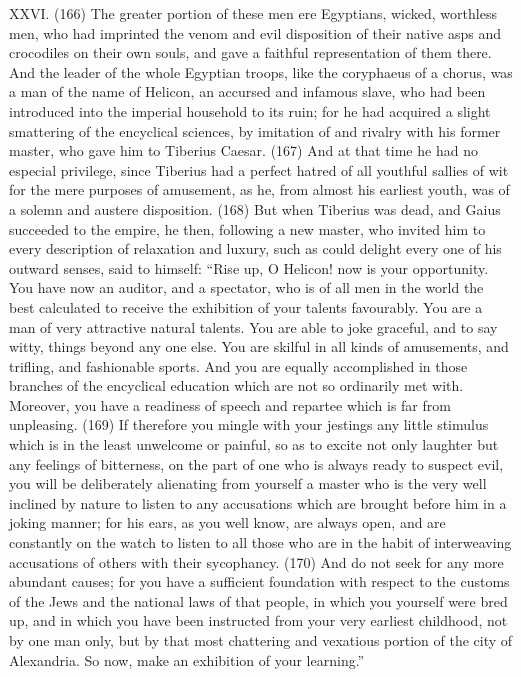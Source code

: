 XXVI. (166) The greater portion of these men ere Egyptians, wicked, worthless men, who had
imprinted the venom and evil disposition of their native asps and crocodiles on their own souls, and
gave a faithful representation of them there. And the leader of the whole Egyptian troops, like the
coryphaeus of a chorus, was a man of the name of Helicon, an accursed and infamous slave, who
had been introduced into the imperial household to its ruin; for he had acquired a slight smattering
of the encyclical sciences, by imitation of and rivalry with his former master, who gave him to
Tiberius Caesar. (167) And at that time he had no especial privilege, since Tiberius had a perfect
hatred of all youthful sallies of wit for the mere purposes of amusement, as he, from almost his
earliest youth, was of a solemn and austere disposition. (168) But when Tiberius was dead, and
Gaius succeeded to the empire, he then, following a new master, who invited him to every
description of relaxation and luxury, such as could delight every one of his outward senses, said to
himself: ``Rise up, O Helicon! now is your opportunity. You have now an auditor, and a spectator,
who is of all men in the world the best calculated to receive the exhibition of your talents favourably.
You are a man of very attractive natural talents. You are able to joke graceful, and to say witty,
things beyond any one else. You are skilful in all kinds of amusements, and trifling, and fashionable
sports. And you are equally accomplished in those branches of the encyclical education which are
not so ordinarily met with. Moreover, you have a readiness of speech and repartee which is far
from unpleasing. (169) If therefore you mingle with your jestings any little stimulus which is in the
least unwelcome or painful, so as to excite not only laughter but any feelings of bitterness, on the
part of one who is always ready to suspect evil, you will be deliberately alienating from yourself a
master who is the very well inclined by nature to listen to any accusations which are brought before
him in a joking manner; for his ears, as you well know, are always open, and are constantly on the
watch to listen to all those who are in the habit of interweaving accusations of others with their
sycophancy. (170) And do not seek for any more abundant causes; for you have a sufficient
foundation with respect to the customs of the Jews and the national laws of that people, in which
you yourself were bred up, and in which you have been instructed from your very earliest
childhood, not by one man only, but by that most chattering and vexatious portion of the city of
Alexandria. So now, make an exhibition of your learning.''

